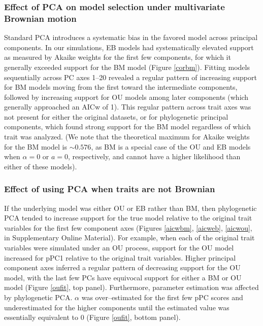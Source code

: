 \documentclass[a4paper,12pt]{article}
\begin{document}
\subsubsection{Effect of PCA on model selection under multivariate Brownian motion}
Standard PCA introduces a systematic bias in the favored model across principal components. In our simulations, EB models had systematically elevated support as measured by Akaike weights for the first few components, for which it generally exceeded support for the BM model (Figure \ref{corbm}). Fitting models sequentially across PC axes 1--20 revealed a regular pattern of increasing support for BM models moving from the first toward the intermediate components, followed by increasing support for OU models among later components (which generally approached an AICw of 1). This regular pattern across trait axes was not present for either the original datasets, or for phylogenetic principal components, which found strong support for the BM model regardless of which trait was analyzed. (We note that the theoretical maximum for Akaike weights for the BM model is $\sim 0.576$, as BM is a special case of the OU and EB models when $\alpha=0$ or $a = 0$, respectively, and cannot have a higher likelihood than either of these models).   

\subsubsection{Effect of using PCA when traits are not Brownian}
If the underlying model was either OU or EB rather than BM, then phylogenetic PCA tended to increase support for the true model relative to the original trait variables for the first few component axes (Figures \ref{aicwbm}, \ref{aicweb}, \ref{aicwou}, in Supplementary Online Material). For example, when each of the original trait variables were simulated under an OU process, support for the OU model increased for pPC1 relative to the original trait variables. Higher principal component axes inferred a regular pattern of decreasing support for the OU model, with the last few PCs have equivocal support for either a BM or OU model (Figure \ref{oufit}, top panel). Furthermore, parameter estimation was affected by phylogenetic PCA. $\alpha$ was over--estimated for the first few pPC scores and underestimated for the higher components until the estimated value was essentially equivalent to 0 (Figure \ref{oufit}, bottom panel). 
\end{document}
